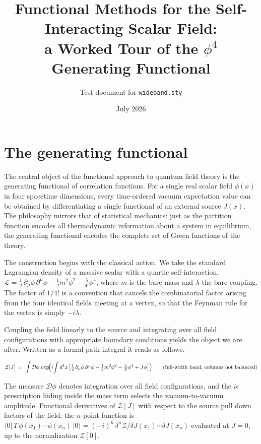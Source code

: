 \documentclass[twocolumn]{article}
\title{Functional Methods for the Self-Interacting Scalar Field:\\
  a Worked Tour of the $\phi^4$ Generating Functional}
\author{Test document for \texttt{wideband.sty}}
\date{July 2026}
\begin{document}
\maketitle

\section{The generating functional}

The central object of the functional approach to quantum field theory is
the generating functional of correlation functions. For a single real
scalar field $\phi(x)$ in four spacetime dimensions, every time-ordered
vacuum expectation value can be obtained by differentiating a single
functional of an external source $J(x)$. The philosophy mirrors that of
statistical mechanics: just as the partition function encodes all
thermodynamic information about a system in equilibrium, the generating
functional encodes the complete set of Green functions of the theory.

The construction begins with the classical action. We take the standard
Lagrangian density of a massive scalar with a quartic self-interaction,
$\mathcal{L} = \tfrac12\,\partial_\mu\phi\,\partial^\mu\phi
- \tfrac12 m^2\phi^2 - \tfrac{\lambda}{4!}\phi^4$,
where $m$ is the bare mass and $\lambda$ the bare coupling. The factor
of $1/4!$ is a convention that cancels the combinatorial factor arising
from the four identical fields meeting at a vertex, so that the Feynman
rule for the vertex is simply $-i\lambda$.

Coupling the field linearly to the source and integrating over all field
configurations with appropriate boundary conditions yields the object we
are after. Written as a formal path integral it reads as follows.

\begin{wideband}
\begin{equation}
  \mathcal{Z}[J] \;=\; \int \mathcal{D}\phi\,
  \exp\!\Bigl( i\!\int d^4x\,
  \bigl[\tfrac12\,\partial_\mu\phi\,\partial^\mu\phi
  - \tfrac12 m^2\phi^2 - \tfrac{\lambda}{4!}\phi^4
  + J\phi\bigr]\Bigr)
  \qquad\text{(full-width band, columns not balanced)}
  \label{eq:Z}
\end{equation}
\end{wideband}

The measure $\mathcal{D}\phi$ denotes integration over all field
configurations, and the $i\epsilon$ prescription hiding inside the mass
term selects the vacuum-to-vacuum amplitude. Functional derivatives of
$\mathcal{Z}[J]$ with respect to the source pull down factors of the
field: the $n$-point function is
$\langle 0|\,T\,\phi(x_1)\cdots\phi(x_n)\,|0\rangle
= (-i)^n\,\delta^n \mathcal{Z}/\delta J(x_1)\cdots\delta J(x_n)$
evaluated at $J=0$, up to the normalization $\mathcal{Z}[0]$.
\end{document}
